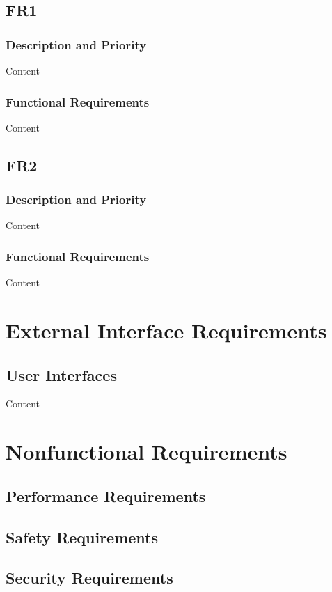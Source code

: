 \documentclass[oneside,a4paper,12pt, times]{book}
\begin{document}
\subsection{FR1}
\subsubsection{Description and Priority}
Content
\subsubsection{Functional Requirements}
Content

\subsection{FR2}
\subsubsection{Description and Priority}
Content
\subsubsection{Functional Requirements}
Content




\section{External Interface Requirements }  
\subsection{User Interfaces}
Content
\section{Nonfunctional Requirements }  

\subsection{Performance Requirements}

\subsection{Safety Requirements}

\subsection{Security Requirements}
\end{document}

